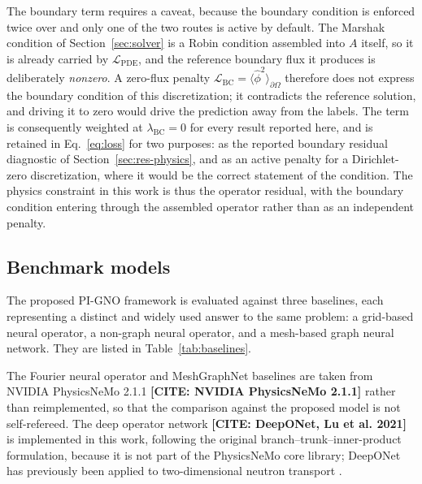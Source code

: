 \documentclass[preprint,12pt]{elsarticle}
\newcommand{\todocite}[1]{\textbf{[CITE: #1]}}
\begin{document}
The boundary term requires a caveat, because the boundary condition is enforced
twice over and only one of the two routes is active by default. The Marshak
condition of Section~\ref{sec:solver} is a Robin condition assembled into $A$
itself, so it is already carried by $\mathcal{L}_{\mathrm{PDE}}$, and the
reference boundary flux it produces is deliberately \emph{nonzero}. A
zero-flux penalty $\mathcal{L}_{\mathrm{BC}} = \langle
\hat{\phi}^{2}\rangle_{\partial\Omega}$ therefore does not express the boundary
condition of this discretization; it contradicts the reference solution, and
driving it to zero would drive the prediction away from the labels. The term is
consequently weighted at $\lambda_{\mathrm{BC}} = 0$ for every result reported
here, and is retained in Eq.~\eqref{eq:loss} for two purposes: as the reported
boundary residual diagnostic of Section~\ref{sec:res-physics}, and as an active
penalty for a Dirichlet-zero discretization, where it would be the correct
statement of the condition. The physics constraint in this work is thus the
operator residual, with the boundary condition entering through the assembled
operator rather than as an independent penalty.

\subsection{Benchmark models}
\label{sec:baselines}

The proposed PI-GNO framework is evaluated against three baselines, each
representing a distinct and widely used answer to the same problem: a
grid-based neural operator, a non-graph neural operator, and a mesh-based graph
neural network. They are listed in Table~\ref{tab:baselines}.

The Fourier neural operator and MeshGraphNet baselines are taken from NVIDIA
PhysicsNeMo 2.1.1 \todocite{NVIDIA PhysicsNeMo 2.1.1} rather than reimplemented,
so that the comparison against the proposed model is not self-refereed. The
deep operator network \todocite{DeepONet, Lu et al. 2021} is implemented in this
work, following the original branch--trunk--inner-product formulation, because
it is not part of the PhysicsNeMo core library; DeepONet has previously been
applied to two-dimensional neutron transport \citep{kobayashi2024}.
\end{document}
